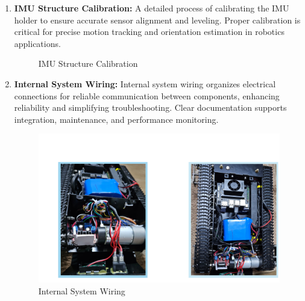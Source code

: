{\begin{enumerate}[label=\textbf{\arabic*}., leftmargin=*]
		\item \textbf{IMU Structure Calibration:} A detailed process of calibrating the IMU holder to ensure accurate sensor alignment and leveling. Proper calibration is critical for precise motion tracking and orientation estimation in robotics applications.
		
		\begin{figure}[H]
			\centering
			\hfill
			\hfill
			\caption{IMU Structure Calibration}
		\end{figure}


        \item \textbf{Internal System Wiring:} Internal system wiring organizes electrical connections for reliable communication between components, enhancing reliability and simplifying troubleshooting. Clear documentation supports integration, maintenance, and performance monitoring.
		\begin{figure}[H]
			\centering
			\includegraphics[scale=0.5]{images/Content/Internal_Wiring_1.png}
			\caption{Internal System Wiring}
		\end{figure}


\end{enumerate}}
